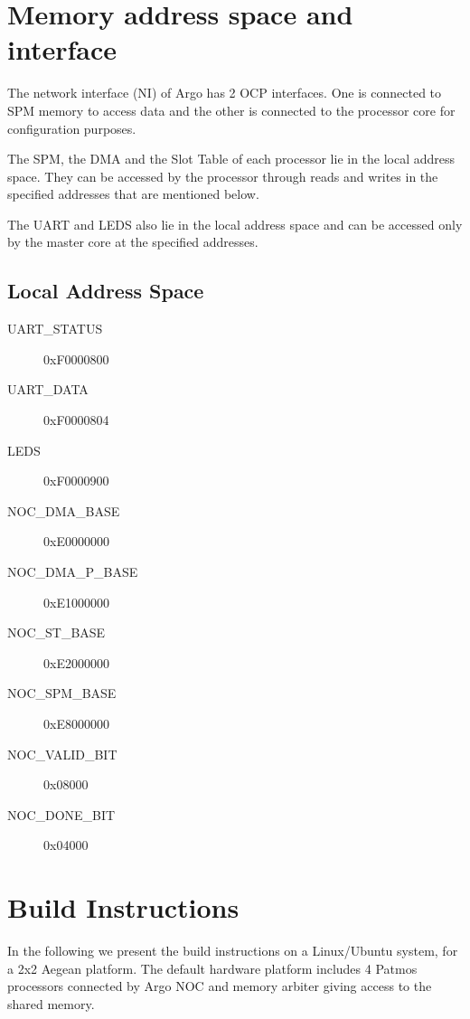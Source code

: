 \documentclass[a4paper,fontsize=10pt,twoside,DIV15,BCOR12mm,headinclude=true,footinclude=false,pagesize,bibtotoc]{scrbook}
\begin{document}
\chapter{Memory address space and interface}
\label{chap:mem}

The network interface (NI) of Argo has 2 OCP\cite{ocp:spec} interfaces. One is connected to SPM memory
to access data and the other is connected to the processor core for configuration purposes.

The SPM, the DMA and the Slot Table of each processor lie in the local address space.
They can be accessed by the processor through reads and writes 
in the specified addresses that are mentioned below.

The UART and LEDS also lie in the local address space and can be accessed only by the master core
at the specified addresses.

\section{Local Address Space}

\begin{description}
\item[UART\_STATUS]      0xF0000800
\item[UART\_DATA]        0xF0000804
\item[LEDS]              0xF0000900
\item[NOC\_DMA\_BASE]    0xE0000000
\item[NOC\_DMA\_P\_BASE] 0xE1000000
\item[NOC\_ST\_BASE]     0xE2000000
\item[NOC\_SPM\_BASE]    0xE8000000
\item[NOC\_VALID\_BIT]   0x08000
\item[NOC\_DONE\_BIT]    0x04000
\end{description}


\chapter{Build Instructions}

In the following we present the build instructions on a Linux/Ubuntu system,
for a 2x2 Aegean platform. The default hardware platform includes 4 Patmos processors 
connected by Argo NOC and memory arbiter giving access to the shared memory.
\end{document}
